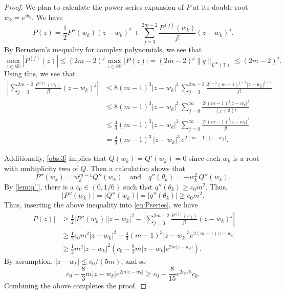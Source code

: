 \documentclass[10pt,a4paper]{amsart}
\def\D{\mathbb{D}}
\def\T{\mathbb{T}}
\def\andspace{\quad\text{and}\quad}
\begin{document}
\begin{proof}
    We plan to calculate the power series expansion of $P$ at its double root $w_k=e^{i\theta_k}$. 
    We have
	\begin{equation}
		\label{eq:Pseries}
		P(z)=\frac 12 P''(w_k)(z-w_k)^2 + \sum_{j=3}^{2m-2} \frac{P^{(j)}(w_k)}{j!} (z-w_k)^j. 
	\end{equation}
	By Bernstein's inequality for complex polynomials, we see that 
	$$
	\max_{z\in \partial\D} |P^{(j)}(z)|
	\leq (2m-2)^j \max_{z\in \partial\D} |P(z)|
	= (2m-2)^j \|q\|_{L^\infty(\T)}
	\leq (2m-2)^j. 
	$$ 
	Using this, we see that
	\begin{align*}
		\left| \sum_{j=3}^{2m-2} \frac{P^{(j)}(w_k)}{j!}(z-w_k)^j \right|
		&\leq 8(m-1)^3|z-w_k|^3 \, \sum_{j=3}^{2m-2} \frac{2^{j-3}(m-1)^{j-3} |z-w_k|^{j-3}}{j!} \\
		&\leq 8(m-1)^3|z-w_k|^3 \, \sum_{j=0}^\infty \frac{2^j(m-1)^j |z-w_k|^j}{(j+3)!} \\
        &\leq \frac{4}{3} (m-1)^3|z-w_k|^3 \, \sum_{j=0}^\infty \frac{2^j(m-1)^j |z-w_k|^j}{j!} \\
		&= \frac{4}{3} (m-1)^3 \, |z-w_k|^3 \, e^{2 (m-1)|z-w_k|}. 
	\end{align*}
    
    
    Additionally, \cref{obs:3} implies that $Q(w_k)=Q'(w_k)=0$ since each $w_k$ is a root with multiplicity two of $Q$. Then a calculation shows that 
    $$
    P''(w_k)=w_k^{m-1}Q''(w_k) \andspace q''(\theta_k)=-w_k^2 \, Q''(w_k).
    $$
    By \cref{lem:q''}, there is a $c_0\in (0,1/6)$ such that $q''(\theta_k)\geq c_0m^2$. Thus,
	$$
	|P''(w_k)|
	=|Q''(w_k)|
	=|q''(\theta_k)|
	\geq c_0 m^2.
	$$
	Thus, inserting the above inequality into \eqref{eq:Pseries}, we have
	\begin{align*}
		|P(z)|
		&\geq \frac 12 |P''(w_k)||z-w_k|^2 - \left| \sum_{j=3}^{2m-2} \frac{P^{(j)}(w_k)}{j!}(z-w_k)^j \right| \\
		&\geq \frac 12 c_0 m^2 |z-w_k|^2- \frac 4 3(m-1)^3|z-w_k|^3 e^{2(m-1)|z-w_k|} \\
		&\geq \frac 12 m^2 |z-w_k|^2 \left( c_0 - \frac 83 m|z-w_k| e^{2 m|z-w_k|}\right).
	\end{align*}
    By assumption, $|z-w_k|\leq c_0/(5m)$, and so 
    $$
    c_0-\frac 8 3m|z-w_k| e^{2 m|z-w_k|}
    \geq c_0-\frac{8}{15} e^{2c_0/5} c_0.
    $$
    Combining the above completes the proof. 
\end{proof}
\end{document}
